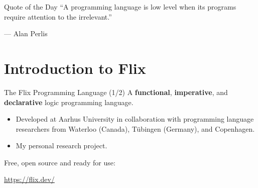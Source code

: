 \begin{frame}{Quote of the Day}
``A programming language is low level when its programs require attention to the irrelevant.''

\begin{flushright}
--- Alan Perlis
\end{flushright}
\end{frame}



\section{Introduction to Flix}

\begin{frame}{The Flix Programming Language (1/2)}
A \textbf{functional}, \textbf{imperative}, and \textbf{declarative} logic
programming language.

\begin{itemize}
    \item Developed at Aarhus University in collaboration with programming
    language researchers from Waterloo (Canada), T\"ubingen (Germany), and
    Copenhagen.
    \item My personal research project. 
\end{itemize}

Free, open source and ready for use:

\begin{center}
    \url{https://flix.dev/}
\end{center}
\end{frame}


